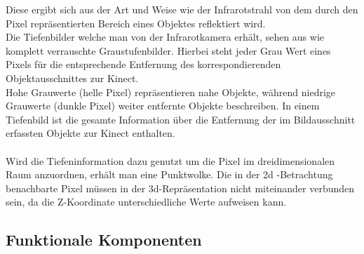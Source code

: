 Diese ergibt sich aus der Art und Weise wie der Infrarotstrahl von dem durch den Pixel repräsentierten Bereich eines Objektes reflektiert wird.\\

Die Tiefenbilder welche man von der Infrarotkamera erhält, sehen aus wie komplett verrauschte Graustufenbilder. Hierbei steht jeder Grau Wert eines Pixels für die entsprechende Entfernung des korrespondierenden Objektausschnittes zur Kinect.\\
Hohe Grauwerte (helle Pixel) repräsentieren nahe Objekte, während niedrige Grauwerte (dunkle Pixel) weiter entfernte Objekte beschreiben. In einem Tiefenbild ist die gesamte Information über die Entfernung der im Bildausschnitt erfassten Objekte zur Kinect enthalten.\\\\
Wird die Tiefeninformation dazu genutzt um die Pixel im dreidimensionalen Raum anzuordnen, erhält man eine Punktwolke. Die in der 2d
-Betrachtung benachbarte Pixel müssen in der 3d-Repräsentation nicht miteinander verbunden sein, da die Z-Koordinate unterschiedliche Werte aufweisen kann.
\subsection{Funktionale Komponenten}
